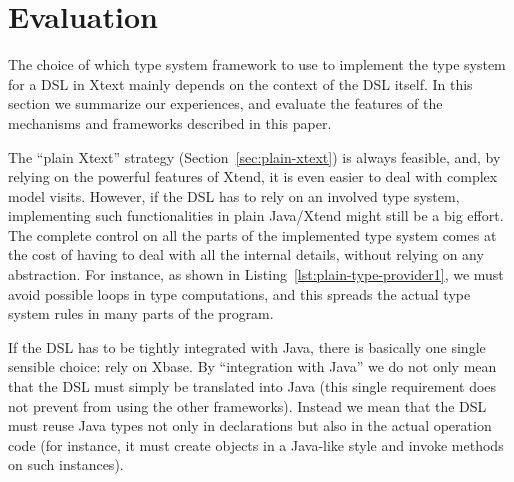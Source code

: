 \section{Evaluation}
\label{sec:evaluation}




The choice of which type system framework to use to implement the type system
for a DSL in Xtext mainly depends on the context of the DSL itself.  In this
section we summarize our experiences, and evaluate the features of the
mechanisms and frameworks described in this paper.

The ``plain Xtext'' strategy (Section~\ref{sec:plain-xtext}) is always feasible,
and, by relying on the powerful features of Xtend, it is even easier to deal
with complex model visits.  However, if the DSL has to rely on an involved type
system, implementing such functionalities in plain Java/Xtend might still be a
big effort.  The complete control on all the parts of the implemented type
system comes at the cost of having to deal with all the internal details,
without relying on any abstraction.  For instance, as shown in
Listing~\ref{lst:plain-type-provider1}, we must avoid possible loops in type
computations, and this spreads the actual type system rules in many parts of the
program.

If the DSL has to be tightly integrated with Java, there is basically one single
sensible choice: rely on Xbase.  By ``integration with Java'' we do not only
mean that the DSL must simply be translated into Java (this single requirement does not
prevent from using the other frameworks).  Instead we mean that the DSL must
reuse Java types not only in declarations but also in the actual operation code
(for instance, it must create objects in a Java-like style and invoke methods on
such instances).

